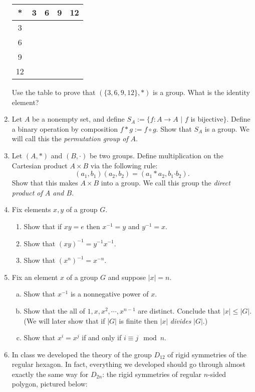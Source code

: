 \documentclass[11pt]{article}
\begin{document}
\begin{enumerate}
	      \begin{center}
		      \begin{tabular}{c|c|c|c|c}
			      *  & 3 & 6 & 9 & 12 \\
			      \hline
			      3  &   &   &   &    \\
			      \hline
			      6  &   &   &   &    \\
			      \hline
			      9  &   &   &   &    \\
			      \hline
			      12 &   &   &   &
		      \end{tabular}
	      \end{center}
	      Use the table to prove that $\left(\{3,6,9,12\},*\right)$ is a group.  What is the identity element?
	\item Let $A$ be a nonempty set, and define $S_A:=\{f:A\to A$ $|$ $f$ is bijective$\}$.  Define a binary operation by composition $f*g := f\circ g$.  Show that $S_A$ is a group.  We will call this the \textit{permutation group of }$A$.
  \item{
  Let $(A,*)$ and $(B,\boldsymbol{\cdot})$ be two groups.  Define multiplication on the Cartesian product $A\times B$ via the following rule:
  \[(a_1,b_1)(a_2,b_2) = (a_1*a_2,b_1\boldsymbol{\cdot}b_2).\]
  Show that this makes $A\times B$ into a group.  We call this group the \textit{direct product of $A$ and $B$}.
  }
	\item{
  Fix elements $x,y$ of a group $G$.
  \begin{enumerate}
    \item{
    Show that if $xy=e$ then $x^{-1}=y$ and $y^{-1}=x$.
    }
    \item{
    Show that $(xy)^{-1} = y^{-1}x^{-1}$.
    }
    \item{
    Show that $(x^n)^{-1} = x^{-n}$.
    }
  \end{enumerate}
  }
	\item Fix an element $x$ of a group $G$ and suppose $|x| = n$.
  \begin{enumerate}[(a)]
    \item Show that $x^{-1}$ is a nonnegative power of $x$.
		\item Show that the all of $1,x,x^2,\cdots,x^{n-1}$ are distinct.  Conclude that $|x|\le|G|$.  (We will later show that if $|G|$ is finite then $|x|$ \textit{divides} $|G|$.)
		\item Show that $x^i=x^j$ if and only if $i\equiv j\mod n$.
	\end{enumerate}
	\item{In class we developed the theory of the group $D_{12}$ of rigid symmetries of the regular hexagon.  In fact, everything we developed should go through almost exactly the same way for $D_{2n}$: the rigid symmetries of regular $n$-sided polygon, pictured below:
}
\end{enumerate}
\end{document}
